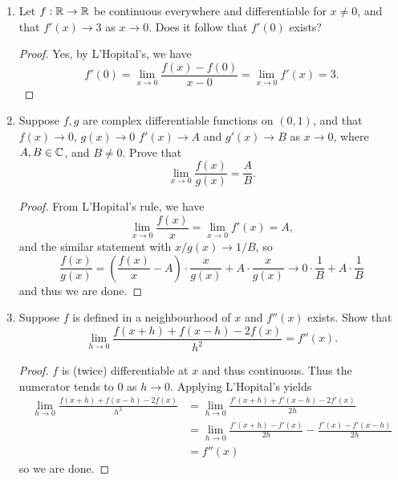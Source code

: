\begin{enumerate}[1.]
    \begin{proof}
        Notice that $f'$ is continuous on a compact domain and thus uniformly continous. Then, we can select $\delta > 0$ such that $|f'(y) - f'(x)| < \epsilon$ whenever $|x - y| < \delta$. Let $x, t \in [a, b]$ such that $|t - x| < \delta$. Then, for some $z$ between $x$ and $t$, we have
        \[
            \left|\frac{f(t) - f(x)}{t - x} - f'(x) \right| = \left|f'(z) - f'(z) \right| < \epsilon
        \]
        since $z$ is between $t$ and $x$ and thus at most as close to $x$ as $t$ is, ie. $\delta$ away. This proves the result. If $f$ is vector-valued, applying the above result to each component and recombining iyields the result for vector-valued functions.
    \end{proof}

\item %
    Let $f: \mathbb{R} \rightarrow \mathbb{R}$ be continuous everywhere and differentiable for $x \ne 0$, and that $f'(x) \to 3$ as $x \to 0$. Does it follow that $f'(0)$ exists?

    \begin{proof}
        Yes, by L'Hopital's, we have
        \[
            f'(0) = \lim_{x \to 0} \frac{f(x) - f(0)}{x - 0} = \lim_{x \to 0} f'(x) = 3.
        \]
    \end{proof}
\item %
    Suppose $f, g$ are complex differentiable functions on $(0, 1)$, and that $f(x) \to 0$, $g(x) \to 0$ $f'(x) \to A$ and $g'(x) \to B$ as $x \to 0$, where $A, B \in \mathbb{C}$, and $B \ne 0$. Prove that
    \[
        \lim_{x \to 0} \frac{f(x)}{g(x)} = \frac{A}{B}.
    \]

    \begin{proof}
        From L'Hopital's rule, we have 
        \[
            \lim_{x \to 0} \frac{f(x)}{x} = \lim_{x \to 0} f'(x) = A,
        \]
        and the similar statement with $x/g(x) \to 1/B$, so
        \[
            \frac{f(x)}{g(x)} = \left( \frac{f(x)}{x} - A \right) \cdot \frac{x}{g(x)} + A \cdot \frac{x}{g(x)} \to 0 \cdot \frac{1}{B} + A \cdot \frac{1}{B}
        \]
        and thus we are done.
    \end{proof}
\item %
    Suppose $f$ is defined in a neighbourhood of $x$ and $f''(x)$ exists. Show that
    \[
        \lim_{h \to 0} \frac{f(x + h) + f(x - h) - 2f(x)}{h^2} = f''(x).
    \]

    \begin{proof}
        $f$ is (twice) differentiable at $x$ and thus continuous. Thus the numerator tends to 0 as $h \to 0$. Applying L'Hopital's yields
        \begin{align*}
            \lim_{h \to 0} \frac{f(x + h) + f(x - h) - 2f(x)}{h^2} 
                &= \lim_{h \to 0} \frac{f'(x + h) + f'(x - h) - 2f'(x)}{2h} \\
                &= \lim_{h \to 0} \frac{f'(x + h) - f'(x)}{2h} - \frac{f'(x) - f'(x - h)}{2h} \\
                &= f''(x) 
        \end{align*}
        so we are done.
    \end{proof}


\end{enumerate}
